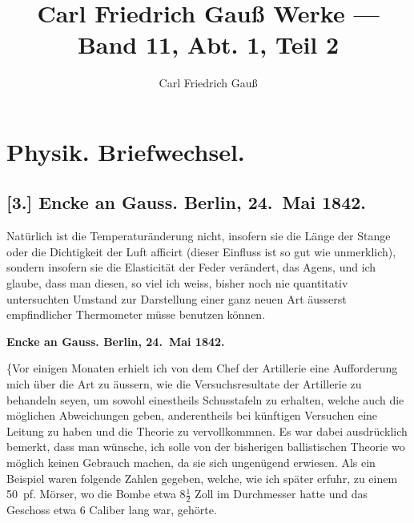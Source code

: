 \documentclass[12pt,a4paper]{article}
\title{Carl Friedrich Gau\ss{} Werke --- Band 11, Abt. 1, Teil 2}
\author{Carl Friedrich Gau\ss{}}
\date{}
\begin{document}
\maketitle
\tableofcontents
\newpage

\section*{Physik. Briefwechsel.}

\subsection*{[3.] Encke an Gauss. Berlin, 24.~Mai 1842.}

Nat\"urlich ist die Temperatur\"anderung nicht, insofern sie die L\"ange der
Stange oder die Dichtigkeit der Luft afficirt (dieser Einfluss ist so gut wie
unmerklich), sondern insofern sie die Elasticit\"at der Feder ver\"andert, das
Agens, und ich glaube, dass man diesen, so viel ich weiss, bisher noch nie
quantitativ untersuchten Umstand zur Darstellung einer ganz neuen Art \"ausserst
empfindlicher Thermometer m\"usse benutzen k\"onnen.\dotfill

\medskip\noindent
\textbf{Encke an Gauss. Berlin, 24.~Mai 1842.}

\medskip\noindent
\{Vor einigen Monaten erhielt ich von dem Chef der Artillerie eine Aufforderung mich \"uber die Art zu \"aussern, wie die Versuchsresultate der Artillerie zu behandeln seyen, um sowohl einestheils Schusstafeln zu erhalten, welche auch die m\"oglichen Abweichungen geben, anderentheils bei k\"unftigen Versuchen eine Leitung zu haben und die Theorie zu vervollkommnen. Es war dabei ausdr\"ucklich bemerkt, dass man w\"unsche, ich solle von der bisherigen ballistischen Theorie wo m\"oglich keinen Gebrauch machen, da sie sich ungen\"ugend erwiesen. Als ein Beispiel waren folgende Zahlen gegeben, welche, wie ich sp\"ater erfuhr, zu einem 50~pf. M\"orser, wo die Bombe etwa $8\frac12$ Zoll im Durchmesser hatte und das Geschoss etwa 6 Caliber lang war, geh\"orte.
\end{document}
